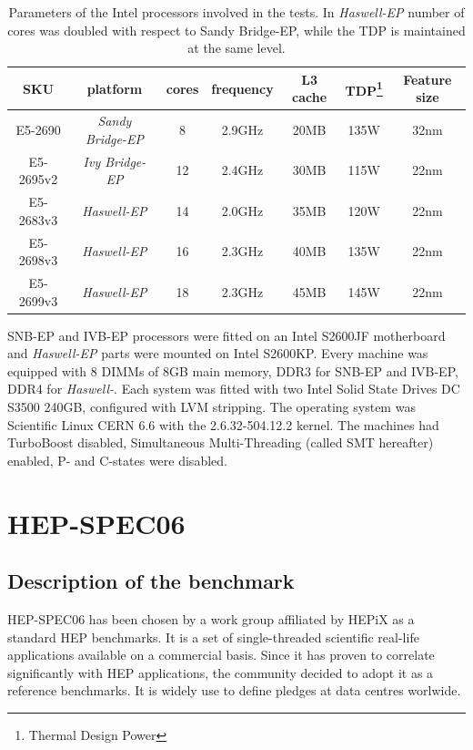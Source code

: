 \documentclass[a4paper]{jpconf}
\begin{document}
\begin{table}[h]
\centering
\begin{tabular}{@{}ccccccc@{}}
\toprule
SKU & platform & cores & frequency & L3 cache & TDP\footnote{Thermal Design Power} & Feature size\\ 
\midrule
E5-2690 & \textit{Sandy Bridge-EP} & 8 & 2.9GHz & 20MB & 135W & 32nm \\
E5-2695v2 & \textit{Ivy Bridge-EP} & 12 & 2.4GHz & 30MB & 115W & 22nm \\
E5-2683v3 & \textit{Haswell-EP} & 14 & 2.0GHz & 35MB & 120W & 22nm\\
E5-2698v3 & \textit{Haswell-EP} & 16 & 2.3GHz & 40MB & 135W & 22nm \\
E5-2699v3 & \textit{Haswell-EP} & 18 & 2.3GHz & 45MB & 145W & 22nm\\
\bottomrule
\end{tabular}
\caption{Parameters of the Intel processors involved in the tests. In \textit{Haswell-EP} number of cores was doubled with respect to Sandy Bridge-EP, while the TDP is maintained at the same level.}
\label{tab:parameters}
\end{table}
SNB-EP and IVB-EP processors were fitted on an Intel S2600JF motherboard and \textit{Haswell-EP} parts were mounted on Intel S2600KP. Every machine was equipped with 8 DIMMs of 8GB main memory, DDR3 for SNB-EP and IVB-EP, DDR4 for \textit{Haswell-}. Each system was fitted with two Intel Solid State Drives DC S3500 240GB, configured with LVM stripping. The operating system was Scientific Linux CERN 6.6 with the 2.6.32-504.12.2 kernel. The machines had TurboBoost disabled, Simultaneous Multi-Threading (called SMT hereafter) enabled, P- and C-states were disabled.

\section{HEP-SPEC06}
\subsection{Description of the benchmark}
HEP-SPEC06 has been chosen by a work group affiliated by HEPiX as a standard HEP benchmarks. It is a set of single-threaded scientific real-life applications available on a commercial basis. Since it has proven to correlate significantly with HEP applications, the community decided to adopt it as a reference benchmarks. It is widely use to define pledges at data centres worlwide.
\end{document}
